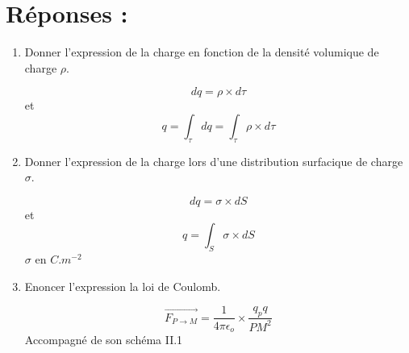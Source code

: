 \documentclass{article}
\begin{document}
\section*{\centering\huge Réponses :}
\begin{enumerate}[label=\arabic{enumi} - , left=0pt, itemsep=1em]
    \item Donner l'expression de la charge en fonction de la densité volumique de charge $\rho$. \par
    \begin{solution}
          \[ dq = \rho \times d\tau \] et \[ q = \int_\tau dq = \int_\tau \rho \times d\tau \]
    \end{solution}
    \item Donner l'expression de la charge lors d'une distribution surfacique de charge $\sigma $. \par
    \begin{solution}
          \[ dq = \sigma \times dS \] et \[ q = \int_S \sigma \times dS \]
          $\sigma$ en $C.m^{-2}$
    \end{solution}
    \item Enoncer l'expression la loi de Coulomb. \par
    \begin{solution}
          \[ \overrightarrow{F_{P \to M}} = \frac{1}{4 \pi \epsilon_o} \times \frac{q_pq}{PM^2} \]
          Accompagné de son schéma II.1


\end{solution}
\end{enumerate}
\end{document}
